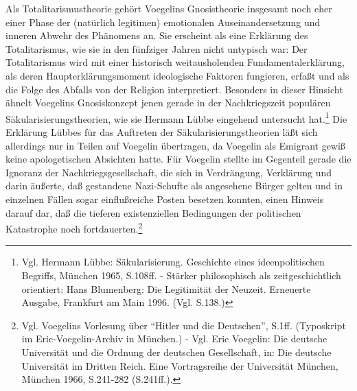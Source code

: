 Als Totalitarismustheorie gehört Voegelins Gnosistheorie insgesamt noch eher
einer Phase der (natürlich legitimen) emotionalen Auseinandersetzung und
inneren Abwehr des Phänomens an. Sie erscheint als eine Erklärung des
Totalitarismus, wie sie in den fünfziger Jahren nicht untypisch war: Der
Totalitarismus wird mit einer historisch weitausholenden Fundamentalerklärung,
als deren Haupterklärungsmoment ideologische Faktoren fungieren, erfaßt und
als die Folge des Abfalls von der Religion interpretiert. Besonders in dieser
Hinsicht ähnelt Voegelins Gnosiskonzept jenen gerade in der Nachkriegszeit
populären Säkularisierungstheorien, wie sie Hermann Lübbe eingehend untersucht
hat.\footnote{Vgl. Hermann Lübbe: Säkularisierung.  Geschichte eines
  ideenpolitischen Begriffs, München 1965, S.108ff. - Stärker philosophisch
  als zeitgeschichtlich orientiert: Hans Blumenberg: Die Legitimität der
  Neuzeit. Erneuerte Ausgabe, Frankfurt am Main 1996. (Vgl. S.138.)} Die
Erklärung Lübbes für das Auftreten der Säkularisierungstheorien läßt sich
allerdings nur in Teilen auf Voegelin übertragen, da Voegelin als Emigrant
gewiß keine apologetischen Absichten hatte. Für Voegelin stellte im Gegenteil
gerade die Ignoranz der Nachkriegsgesellschaft, die sich in Verdrängung,
Verklärung und darin äußerte, daß gestandene Nazi-Schufte als angesehene
Bürger gelten und in einzelnen Fällen sogar einflußreiche Posten besetzen
konnten, einen Hinweis darauf dar, daß die tieferen existenziellen Bedingungen
der politischen Katastrophe noch fortdauerten.\footnote{Vgl.  Voegelins
  Vorlesung über "`Hitler und die Deutschen"', S.1ff. (Typoskript im
  Eric-Voegelin-Archiv in München.) - Vgl. Eric Voegelin: Die deutsche
  Universität und die Ordnung der deutschen Gesellschaft, in: Die deutsche
  Universität im Dritten Reich.  Eine Vortragsreihe der Universität München,
  München 1966, S.241-282 (S.241ff.).}

